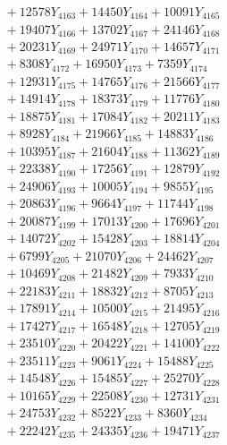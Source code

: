 \documentclass[a4paper,10pt]{article}
\begin{document}
{\begin{align}
&\;  + 12578 Y_{4163} + 14450 Y_{4164} + 10091 Y_{4165} \\[0.3ex]
&\;  + 19407 Y_{4166} + 13702 Y_{4167} + 24146 Y_{4168} \\[0.5ex]\allowbreak
&\;  + 20231 Y_{4169} + 24971 Y_{4170} + 14657 Y_{4171} \\[0.3ex]
&\;  + 8308 Y_{4172} + 16950 Y_{4173} + 7359 Y_{4174} \\[0.3ex]
&\;  + 12931 Y_{4175} + 14765 Y_{4176} + 21566 Y_{4177} \\[0.3ex]
&\;  + 14914 Y_{4178} + 18373 Y_{4179} + 11776 Y_{4180} \\[0.3ex]
&\;  + 18875 Y_{4181} + 17084 Y_{4182} + 20211 Y_{4183} \\[0.3ex]
&\;  + 8928 Y_{4184} + 21966 Y_{4185} + 14883 Y_{4186} \\[0.3ex]
&\;  + 10395 Y_{4187} + 21604 Y_{4188} + 11362 Y_{4189} \\[0.3ex]
&\;  + 22338 Y_{4190} + 17256 Y_{4191} + 12879 Y_{4192} \\[0.3ex]
&\;  + 24906 Y_{4193} + 10005 Y_{4194} + 9855 Y_{4195} \\[0.3ex]
&\;  + 20863 Y_{4196} + 9664 Y_{4197} + 11744 Y_{4198} \\[0.5ex]\allowbreak
&\;  + 20087 Y_{4199} + 17013 Y_{4200} + 17696 Y_{4201} \\[0.3ex]
&\;  + 14072 Y_{4202} + 15428 Y_{4203} + 18814 Y_{4204} \\[0.3ex]
&\;  + 6799 Y_{4205} + 21070 Y_{4206} + 24462 Y_{4207} \\[0.3ex]
&\;  + 10469 Y_{4208} + 21482 Y_{4209} + 7933 Y_{4210} \\[0.3ex]
&\;  + 22183 Y_{4211} + 18832 Y_{4212} + 8705 Y_{4213} \\[0.3ex]
&\;  + 17891 Y_{4214} + 10500 Y_{4215} + 21495 Y_{4216} \\[0.3ex]
&\;  + 17427 Y_{4217} + 16548 Y_{4218} + 12705 Y_{4219} \\[0.3ex]
&\;  + 23510 Y_{4220} + 20422 Y_{4221} + 14100 Y_{4222} \\[0.3ex]
&\;  + 23511 Y_{4223} + 9061 Y_{4224} + 15488 Y_{4225} \\[0.3ex]
&\;  + 14548 Y_{4226} + 15485 Y_{4227} + 25270 Y_{4228} \\[0.5ex]\allowbreak
&\;  + 10165 Y_{4229} + 22508 Y_{4230} + 12731 Y_{4231} \\[0.3ex]
&\;  + 24753 Y_{4232} + 8522 Y_{4233} + 8360 Y_{4234} \\[0.3ex]
&\;  + 22242 Y_{4235} + 24335 Y_{4236} + 19471 Y_{4237} \\[0.3ex]

\end{align}}
\end{document}

